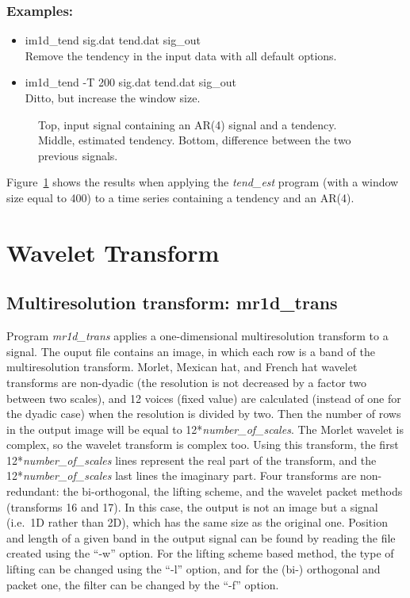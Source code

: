 \subsubsection*{Examples:}
\begin{itemize}
\item im1d\_tend sig.dat tend.dat sig\_out \\
Remove the tendency in the input data with all default options.
\item im1d\_tend -T 200 sig.dat tend.dat sig\_out   \\
Ditto, but increase the window size.
\end{itemize}
\begin{figure}[htb]
\centerline{
\vbox{ 
}}
\caption{Top, input signal containing an AR(4) signal and a tendency. Middle,
estimated tendency. Bottom, difference between the two previous signals.}
\label{fig_artend}
\end{figure}  
Figure~\ref{fig_artend} shows the results when applying the {\em tend\_est}
program (with a window size equal to 400) 
to a time series containing a tendency and an AR(4). 


\section{Wavelet Transform}
\subsection{Multiresolution transform: mr1d\_trans}
\label{sect_mr1dtrans}

Program {\em mr1d\_trans} applies a one-dimensional multiresolution
transform to a signal. The ouput file contains an image, in which
each row is a band of the multiresolution transform. Morlet, Mexican hat,
and French hat wavelet transforms are non-dyadic (the resolution is
not decreased by a factor two between two scales), 
and 12 voices (fixed value) are calculated (instead of one for the
dyadic case) when the resolution is divided by two. Then the number of 
rows in the output image will be equal to 12*{\em number\_of\_scales}.
The Morlet wavelet is complex, so the wavelet transform is complex too.
Using this transform, the first 12*{\em number\_of\_scales}  lines represent
the real part of the transform, and the 12*{\em number\_of\_scales} last lines 
the imaginary part. Four transforms are non-redundant: the bi-orthogonal,
the lifting scheme, and the wavelet packet methods (transforms 16 and 17). 
In this case, the output is not an 
image but a signal (i.e.\ 1D rather than 2D), 
which has the same size as the original one.
Position and length of a given band in the output signal can be found by
reading the file created using the ``-w'' option. For the lifting scheme
based method, the type of lifting can be changed using the ``-l'' option,
and for the (bi-) orthogonal and packet one, the filter can be changed
by the ``-f'' option.

